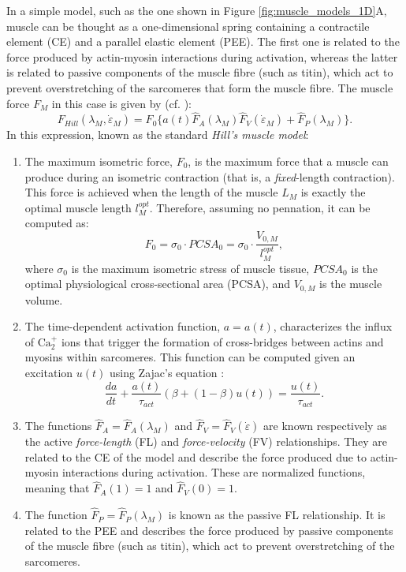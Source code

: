 \documentclass{sfuthesis}
\numberwithin{equation}{section}
\numberwithin{figure}{chapter}
\numberwithin{table}{chapter}
\theoremstyle{definition}
\newcommand{\depsilon}{\dot{\varepsilon}}
\begin{document}
In a simple model, such as the one shown in Figure \ref{fig:muscle_models_1D}A, muscle can be thought as a one-dimensional spring containing a contractile element (CE) and a parallel elastic element (PEE). The first one is related to the force produced by actin-myosin interactions during activation, whereas the latter is related to passive components of the muscle fibre (such as titin), which act to prevent overstretching of the sarcomeres that form the muscle fibre. The muscle force $F_M$ in this case is given by (cf. \cite{Zajac1989}):
\begin{equation} \label{eq:Hill_force}
    F_{Hill}(\lambda_M, \depsilon_M) = F_0 \Big\{ a(t) \widehat{F}_A(\lambda_M) \widehat{F}_V(\depsilon_M) + \widehat{F}_P(\lambda_M) \Big\}.
\end{equation}
In this expression, known as the standard \textit{Hill's muscle model}:
\begin{enumerate}
    \item The maximum isometric force, $F_0$, is the maximum force that a muscle can produce during an isometric contraction (that is, a \textit{fixed}-length contraction). This force is achieved when the length of the muscle $L_M$ is exactly the optimal muscle length $l_M^{opt}$. Therefore, assuming no pennation, it can be computed as:
    \begin{equation}
        F_0 = \sigma_0 \cdot PCSA_0 = \sigma_0 \cdot \dfrac{V_{0,M}}{l_M^{opt}},
    \end{equation}
    where $\sigma_0$ is the maximum isometric stress of muscle tissue, $PCSA_0$ is the optimal physiological cross-sectional area (PCSA), and $V_{0,M}$ is the muscle volume.
    \item The time-dependent activation function, $a = a(t)$, characterizes the influx of $\mathrm{Ca}_2^+$ ions that trigger the formation of cross-bridges between actins and myosins within sarcomeres. This function can be computed given an excitation $u(t)$ using Zajac's equation \cite{Zajac1989}:
    \begin{equation} \label{eq:zajac}
        \dfrac{da}{dt} + \dfrac{a(t)}{\tau_{act}} \left( \beta + (1-\beta)u(t) \right) = \dfrac{u(t)}{\tau_{act}}.
    \end{equation}
    \item The functions $\widehat{F}_A = \widehat{F}_A(\lambda_M)$ and $\widehat{F}_V = \widehat{F}_V(\depsilon)$ are known respectively as the active \textit{force-length} (FL) and \textit{force-velocity} (FV) relationships. They are related to the CE of the model and describe the force produced due to actin-myosin interactions during activation. These are normalized functions, meaning that $\widehat{F}_A(1) = 1$ and $\widehat{F}_V(0) = 1$.
    \item The function $\widehat{F}_P = \widehat{F}_P(\lambda_M)$ is known as the passive FL relationship. It is related to the PEE and describes the force produced by passive components of the muscle fibre (such as titin), which act to prevent overstretching of the sarcomeres.
\end{enumerate} 
\end{document}
